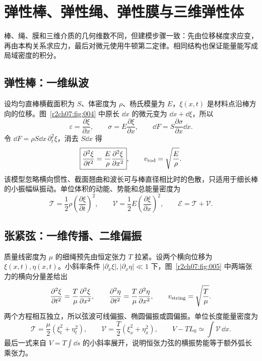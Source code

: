 \section{弹性棒、弹性绳、弹性膜与三维弹性体}
\label{r2ch07:sec:models}

棒、绳、膜和三维介质的几何维数不同，但建模步骤一致：先由位移梯度求应变，再由本构关系求应力，最后对微元使用牛顿第二定律。相同结构也保证能量能写成局域密度的积分。

\subsection{弹性棒：一维纵波}
\label{r2ch07:subsec:rod}

设均匀直棒横截面积为 $S$、体密度为 $\rho$、杨氏模量为 $E$，$\xi(x,t)$ 是材料点沿棒方向的位移。图~\ref{r2ch07:fig:004} 中原长 $\dd x$ 的微元变为 $\dd x+\dd\xi$，所以
\begin{equation}
 \varepsilon=\frac{\partial\xi}{\partial x},\qquad
 \sigma=E\frac{\partial\xi}{\partial x},\qquad
 \dd F=S\frac{\partial\sigma}{\partial x}\dd x.
 \label{r2ch07:eq:010}
\end{equation}
令 $\dd F=\rho S\dd x\,\partial_t^2\xi$，消去 $S\dd x$ 得
\begin{equation}
 \boxed{\frac{\partial^2\xi}{\partial t^2}
 =\frac E\rho\frac{\partial^2\xi}{\partial x^2}},
 \qquad v_{\rm rod}=\sqrt{\frac E\rho}.
 \label{r2ch07:eq:011}
\end{equation}
该模型忽略横向惯性、截面翘曲和波长可与棒直径相比时的色散，只适用于细长棒的小振幅纵振动。单位体积的动能、势能和总能量密度为
\begin{equation}
 \mathcal T=\frac12\rho\left(\frac{\partial\xi}{\partial t}\right)^2,\qquad
 \mathcal V=\frac12E\left(\frac{\partial\xi}{\partial x}\right)^2,\qquad
 \mathcal E=\mathcal T+\mathcal V.
 \label{r2ch07:eq:012}
\end{equation}
\figRodModel

\subsection{张紧弦：一维传播、二维偏振}
\label{r2ch07:subsec:string}

质量线密度为 $\mu$ 的细绳预先由恒定张力 $T$ 拉紧。设两个横向位移为 $\xi(x,t),\eta(x,t)$。小斜率条件 $|\partial_x\xi|,|\partial_x\eta|\ll1$ 下，图~\ref{r2ch07:fig:005} 中两端张力的横向分量差给出
\begin{equation}
 \frac{\partial^2\xi}{\partial t^2}=\frac T\mu\frac{\partial^2\xi}{\partial x^2},\qquad
 \frac{\partial^2\eta}{\partial t^2}=\frac T\mu\frac{\partial^2\eta}{\partial x^2},\qquad
 v_{\rm string}=\sqrt{\frac T\mu}.
 \label{r2ch07:eq:013}
\end{equation}
两个方程相互独立，所以弦波可线偏振、椭圆偏振或圆偏振。单位长度能量密度为
\begin{equation}
 \mathcal T=\frac\mu2(\xi_t^2+\eta_t^2),\qquad
 \mathcal V=\frac T2(\xi_x^2+\eta_x^2),\qquad
 V-TL_0\simeq\int\mathcal V\,\dd x.
 \label{r2ch07:eq:014}
\end{equation}
最后一式来自 $V=T\int\dd s$ 的小斜率展开，说明恒张力弦的横振势能等于额外弧长乘张力。
\figStringModel

